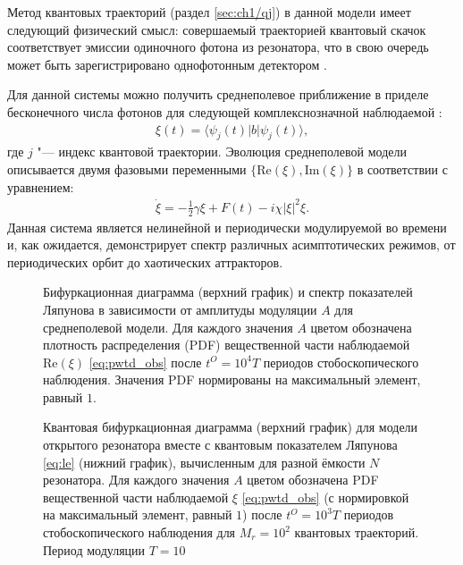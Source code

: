 Метод квантовых траекторий (раздел \cref{sec:ch1/qj}) в данной модели имеет следующий физический смысл: совершаемый траекторией квантовый скачок соответствует эмиссии одиночного фотона из резонатора, что в свою очередь может быть зарегистрировано однофотонным детектором \cite{Delteil2014, Cohen2015}.

Для данной системы можно получить среднеполевое приближение в приделе бесконечного числа фотонов для следующей комплекснозначной наблюдаемой \cite{Spiller1994, Brun1996}:
\begin{equation}
	\label{eq:pwtd_obs}
	\begin{gathered}
		\xi(t) = \langle \psi_j(t)| b | \psi_j(t) \rangle,
	\end{gathered}
\end{equation}
где $j$ "--- индекс квантовой траектории. Эволюция среднеполевой модели описывается двумя фазовыми переменными $\{\text{Re}(\xi),\text{Im}(\xi)\}$ в соответствии с уравнением:
\begin{equation}
	\label{eq:pwtd_mean_field}
	\begin{gathered}
		\dot{\xi} = -\frac{1}{2}\gamma\xi + F(t) - i\chi|\xi|^2\xi.
	\end{gathered}
\end{equation}
Данная система является нелинейной и периодически модулируемой во времени и, как ожидается, демонстрирует спектр различных асимптотических режимов, от периодических орбит до хаотических аттракторов.

\begin{figure}[ht]
	\caption[Бифуркационная диаграмма и спектр показателей Ляпунова в зависимости от амплитуды модуляции в среднеполевой модели квантового резонатора с утечкой]{
		Бифуркационная диаграмма (верхний график) и спектр показателей Ляпунова \cite{Benettin1976} в зависимости от амплитуды модуляции $A$ для среднеполевой модели. Для каждого значения $A$ цветом обозначена плотность распределения (PDF) вещественной части наблюдаемой $\text{Re}(\xi)$ \cref{eq:pwtd_obs} после \(t^O = 10^4T\) периодов стобоскопического наблюдения. Значения PDF нормированы на максимальный элемент, равный $1$.
	}
	\label{fig:pwtd_1}
\end{figure}

\begin{figure}[ht]
	\caption[Квантовая бифуркационная диаграмма для модели открытого резонатора вместе с квантовым показателем Ляпунова]{
		Квантовая бифуркационная диаграмма (верхний график) для модели открытого резонатора вместе с квантовым показателем Ляпунова \cref{eq:le} (нижний график), вычисленным для разной ёмкости $N$ резонатора. 
		Для каждого значения $A$ цветом обозначена PDF вещественной части наблюдаемой $\xi$ \cref{eq:pwtd_obs} (с нормировкой на максимальный элемент, равный $1$) после \(t^O = 10^3T\) периодов стобоскопического наблюдения для $M_r=10^2$ квантовых траекторий. Период модуляции $T=10$
	}
	\label{fig:pwtd_2}
\end{figure}


